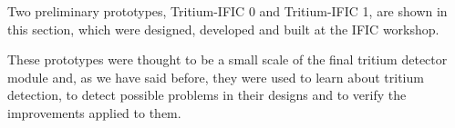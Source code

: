Two preliminary prototypes, Tritium-IFIC 0 and Tritium-IFIC 1, are shown in this section, which were designed, developed and built at the IFIC workshop.

These prototypes were thought to be a small scale of the final tritium detector module and, as we have said before, they were used to learn about tritium detection, to detect possible problems in their designs and to verify the improvements applied to them.
